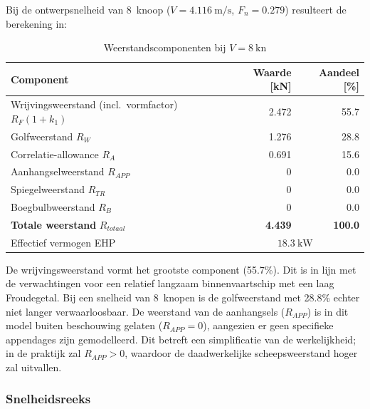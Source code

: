 Bij de ontwerpsnelheid van 8~knoop ($V = 4.116\ \mathrm{m/s}$, $F_n = 0.279$) resulteert de berekening in:

\begin{table}[h!]
\centering
\caption{Weerstandscomponenten bij $V = 8\ \mathrm{kn}$}
\label{tab:holtrop_results_8kn}
\begin{tabular}{lrr}
\toprule
Component & Waarde [kN] & Aandeel [\%] \\
\midrule
Wrijvingsweerstand (incl.\ vormfactor) $R_F(1+k_1)$ & 2.472 & 55.7 \\
Golfweerstand $R_W$                                  & 1.276 & 28.8 \\
Correlatie-allowance $R_A$                           & 0.691 & 15.6 \\
Aanhangselweerstand $R_{APP}$                        & 0     & 0.0  \\
Spiegelweerstand $R_{TR}$                            & 0     & 0.0  \\
Boegbulbweerstand $R_B$                              & 0     & 0.0  \\
\midrule
\textbf{Totale weerstand} $R_{totaal}$               & \textbf{4.439} & \textbf{100.0} \\
\midrule
Effectief vermogen EHP & \multicolumn{2}{c}{$18.3\ \mathrm{kW}$} \\
\bottomrule
\end{tabular}
\end{table}

De wrijvingsweerstand vormt het grootste component (55.7\%). Dit is in lijn met de verwachtingen voor een relatief langzaam binnenvaartschip met een laag Froudegetal. Bij een snelheid van 8~knopen is de golfweerstand met 28.8\% echter niet langer verwaarloosbaar. De weerstand van de aanhangsels ($R_{APP}$) is in dit model buiten beschouwing gelaten ($R_{APP} = 0$), aangezien er geen specifieke appendages zijn gemodelleerd. Dit betreft een simplificatie van de werkelijkheid; in de praktijk zal $R_{APP} > 0$, waardoor de daadwerkelijke scheepsweerstand hoger zal uitvallen.

\subsubsection{\textbf{Snelheidsreeks}}

